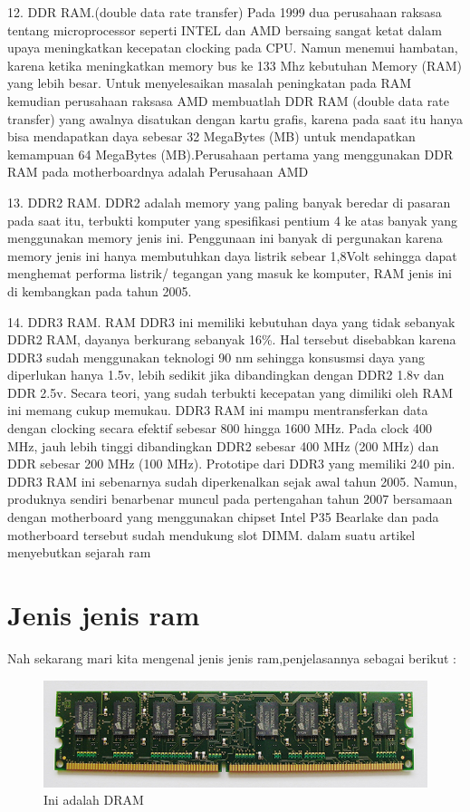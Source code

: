 12. DDR RAM.(double data rate transfer) Pada 1999 dua perusahaan raksasa tentang microprocessor seperti INTEL dan AMD bersaing sangat ketat dalam upaya meningkatkan kecepatan clocking pada CPU. Namun menemui hambatan, karena ketika meningkatkan memory bus ke 133 Mhz kebutuhan Memory (RAM) yang lebih besar. Untuk menyelesaikan masalah peningkatan pada RAM kemudian perusahaan raksasa AMD membuatlah DDR RAM (double data rate transfer) yang awalnya disatukan dengan kartu grafis, karena pada saat itu hanya bisa mendapatkan daya sebesar 32 MegaBytes (MB) untuk mendapatkan kemampuan 64 MegaBytes (MB).Perusahaan pertama yang menggunakan DDR RAM pada motherboardnya adalah Perusahaan AMD

13. DDR2 RAM. DDR2 adalah memory yang paling banyak beredar di pasaran pada saat itu, terbukti komputer yang spesifikasi pentium 4 ke atas banyak yang menggunakan memory jenis ini. Penggunaan ini banyak di pergunakan karena memory jenis ini hanya membutuhkan daya listrik sebear 1,8Volt sehingga dapat menghemat performa listrik/ tegangan yang masuk ke komputer, RAM jenis ini di kembangkan pada tahun 2005.

14. DDR3 RAM. RAM DDR3 ini memiliki kebutuhan daya yang tidak sebanyak DDR2 RAM, dayanya berkurang sebanyak 16\%. Hal tersebut disebabkan karena DDR3 sudah menggunakan teknologi 90 nm sehingga konsusmsi daya yang diperlukan hanya 1.5v, lebih sedikit jika dibandingkan dengan DDR2 1.8v dan DDR 2.5v. Secara teori, yang sudah terbukti kecepatan yang dimiliki oleh RAM ini memang cukup memukau. DDR3 RAM ini mampu mentransferkan data dengan clocking secara efektif sebesar 800 hingga 1600 MHz. Pada clock 400 MHz, jauh lebih tinggi dibandingkan DDR2 sebesar 400 MHz (200 MHz) dan DDR sebesar 200 MHz (100 MHz). Prototipe dari DDR3 yang memiliki 240 pin. DDR3 RAM ini sebenarnya sudah diperkenalkan sejak awal tahun 2005. Namun, produknya sendiri benar\-benar muncul pada pertengahan tahun 2007 bersamaan dengan motherboard yang menggunakan chipset Intel P35 Bearlake dan pada motherboard tersebut sudah mendukung slot DIMM.
dalam suatu artikel menyebutkan sejarah ram \cite{kan1995random}

\section{Jenis \- jenis ram}
Nah sekarang mari kita mengenal jenis \- jenis ram,penjelasannya sebagai berikut :


  \begin{figure}[ht]
  \centerline{\includegraphics[width=1\textwidth]{figures/DRAM.jpg}}
  \caption{Ini adalah DRAM}
  \label{DRAM}
  \end{figure}

